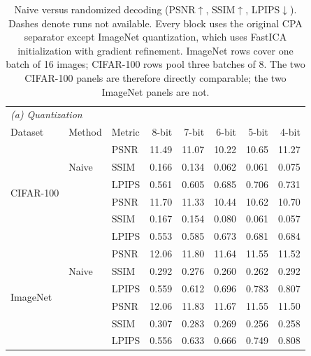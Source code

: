 \begin{table}[!t]
\centering
\caption{Naive versus randomized decoding (PSNR$\uparrow$, SSIM$\uparrow$,
LPIPS$\downarrow$). Dashes denote runs not available. Every block uses the
original CPA separator except ImageNet quantization, which uses FastICA
initialization with gradient refinement. ImageNet rows cover one batch of 16
images; CIFAR-100 rows pool three batches of 8. The two CIFAR-100 panels are
therefore directly comparable; the two ImageNet panels are not.}
\label{tab:compression}
\small
\setlength{\tabcolsep}{0.5pt}
\renewcommand{\arraystretch}{1.0}

\begin{tabular*}{\columnwidth}{@{\extracolsep{\fill}}lllrrrrr@{}}
\toprule
\multicolumn{8}{l}{\textit{(a) Quantization}}\\
Dataset & Method & Metric & 8-bit & 7-bit & 6-bit & 5-bit & 4-bit\\
\midrule
\multirow{6}{*}{CIFAR-100} & \multirow{3}{*}{Naive} & PSNR & 11.49 & 11.07 & 10.22 & 10.65 & 11.27\\
 &  & SSIM & 0.166 & 0.134 & 0.062 & 0.061 & 0.075\\
 &  & LPIPS & 0.561 & 0.605 & 0.685 & 0.706 & 0.731\\
 & \multirow{3}{*}{\cora{}} & PSNR & 11.70 & 11.33 & 10.44 & 10.62 & 10.70\\
 &  & SSIM & 0.167 & 0.154 & 0.080 & 0.061 & 0.057\\
 &  & LPIPS & 0.553 & 0.585 & 0.673 & 0.681 & 0.684\\
\midrule
\multirow{6}{*}{ImageNet} & \multirow{3}{*}{Naive} & PSNR & 12.06 & 11.80 & 11.64 & 11.55 & 11.52\\
 &  & SSIM & 0.292 & 0.276 & 0.260 & 0.262 & 0.292\\
 &  & LPIPS & 0.559 & 0.612 & 0.696 & 0.783 & 0.807\\
 & \multirow{3}{*}{\cora{}} & PSNR & 12.06 & 11.83 & 11.67 & 11.55 & 11.50\\
 &  & SSIM & 0.307 & 0.283 & 0.269 & 0.256 & 0.258\\
 &  & LPIPS & 0.556 & 0.633 & 0.666 & 0.749 & 0.808\\
\bottomrule
\end{tabular*}


\end{table}
